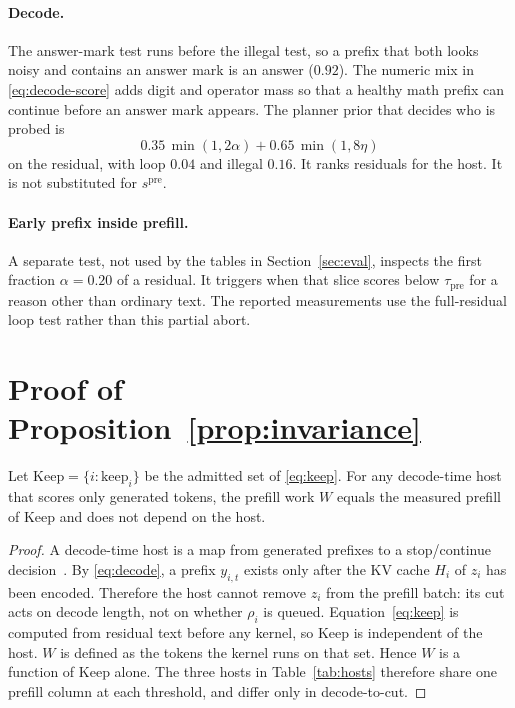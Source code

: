 \paragraph{Decode.}
The answer-mark test runs before the illegal test, so a prefix that both looks noisy and contains an answer mark is an answer ($0.92$).
The numeric mix in \eqref{eq:decode-score} adds digit and operator mass so that a healthy math prefix can continue before an answer mark appears.
The planner prior that decides who is probed is
\[
0.35\,\min(1,2\alpha) + 0.65\,\min(1,8\eta)
\]
on the residual, with loop $0.04$ and illegal $0.16$.
It ranks residuals for the host.
It is not substituted for $s^{\mathrm{pre}}$.

\paragraph{Early prefix inside prefill.}
A separate test, not used by the tables in Section~\ref{sec:eval}, inspects the first fraction $\alpha{=}0.20$ of a residual.
It triggers when that slice scores below $\tau_{\mathrm{pre}}$ for a reason other than ordinary text.
The reported measurements use the full-residual loop test rather than this partial abort.

\section{Proof of Proposition~\ref{prop:invariance}}
\label{app:invariance}

\begin{proposition*}
Let $\mathrm{Keep} = \{ i : \mathrm{keep}_i \}$ be the admitted set of \eqref{eq:keep}.
For any decode-time host that scores only generated tokens, the prefill work $W$ equals the measured prefill of $\mathrm{Keep}$ and does not depend on the host.
\end{proposition*}

\begin{proof}
A decode-time host is a map from generated prefixes to a stop/continue decision~\citep{esc,specrej,dpts}.
By \eqref{eq:decode}, a prefix $y_{i,t}$ exists only after the KV cache $H_i$ of $z_i$ has been encoded.
Therefore the host cannot remove $z_i$ from the prefill batch: its cut acts on decode length, not on whether $\rho_i$ is queued.
Equation~\eqref{eq:keep} is computed from residual text before any kernel, so $\mathrm{Keep}$ is independent of the host.
$W$ is defined as the tokens the kernel runs on that set.
Hence $W$ is a function of $\mathrm{Keep}$ alone.
The three hosts in Table~\ref{tab:hosts} therefore share one prefill column at each threshold, and differ only in decode-to-cut.
\end{proof}

